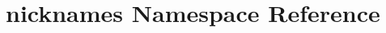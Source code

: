 \hypertarget{namespacenicknames}{
\section{nicknames Namespace Reference}
\label{namespacenicknames}
}
